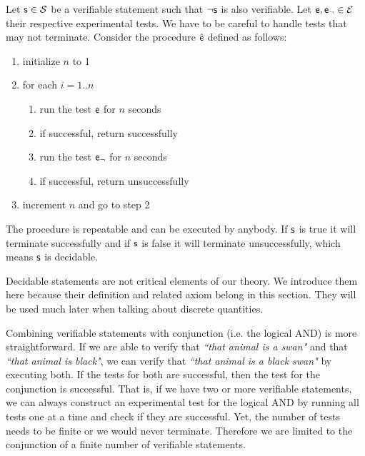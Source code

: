 \documentclass[11pt,letterpaper,fleqn]{memoir} %
\begin{document}
\begin{mathSection}
\begin{justification}
		Let $\mathsf{s} \in \mathcal{S}$ be a verifiable statement such that $\neg\mathsf{s}$ is also verifiable. Let $\mathsf{e}, \mathsf{e}_\neg \in \mathcal{E}$ their respective experimental tests. We have to be careful to handle tests that may not terminate. Consider the procedure $\hat{\mathsf{e}}$ defined as follows:
		\begin{enumerate}
			\item initialize $n$ to 1
			\item for each $i=1..n$
			\begin{enumerate}
				\item run the test $\mathsf{e}$ for $n$ seconds
				\item if successful, return successfully
				\item run the test $\mathsf{e}_\neg$ for $n$ seconds
				\item if successful, return unsuccessfully
			\end{enumerate}
			\item increment $n$ and go to step 2
		\end{enumerate}
	    The procedure is repeatable and can be executed by anybody. If $\mathsf{s}$ is true it will terminate successfully and if $\mathsf{s}$ is false it will terminate unsuccessfully, which means $\mathsf{s}$ is decidable.
	\end{justification}

\end{mathSection}

Decidable statements are not critical elements of our theory. We introduce them here because their definition and related axiom belong in this section. They will be used much later when talking about discrete quantities.

Combining verifiable statements with conjunction (i.e. the logical AND) is more straightforward. If we are able to verify that \emph{``that animal is a swan"} and that \emph{``that animal is black"}, we can verify that \emph{``that animal is a black swan"} by executing both. If the tests for both are successful, then the test for the conjunction is successful. That is, if we have two or more verifiable statements, we can always construct an experimental test for the logical AND by running all tests one at a time and check if they are successful. Yet, the number of tests needs to be finite or we would never terminate. Therefore we are limited to the conjunction of a finite number of verifiable statements.
\end{document}
